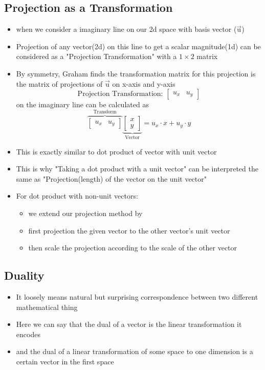 \documentclass[a4paper]{article}
\begin{document}
\subsection{Projection as a Transformation}
\begin{itemize}
	\item when we consider a imaginary line on our 2d space with
	      basis vector ($\vec{\text{u}}$)
	\item Projection of any vector(2d) on this line to get
	      a scalar magnitude(1d) can be considered as a
	      "Projection Transformation" with a
	      $1 \times 2$ matrix
	\item By symmetry, Graham finds the transformation
	      matrix for this projection is the matrix of projections
	      of $\vec{\text{u}}$ on x-axis and y-axis
	      \[
		      \text{Projection Transformation: }
		      \begin{bmatrix}
			      u_{x} & u_{y}  \end{bmatrix}
	      \]
	      on the imaginary line can be calculated as
	      \[
		      \overbrace{
			      \begin{bmatrix}
				      u_{x} & u_{y}  \end{bmatrix}
		      }^{\text{Transform}}
		      \underbrace{
			      \begin{bmatrix}
				      x \\
				      y\end{bmatrix}
		      }_{\text{Vector}}
		      = u_{x} \cdot x
		      + u_{y} \cdot y
	      \]
	\item This is exactly similar to dot product of vector
	      with unit vector
	\item This is why "Taking a dot product with a unit vector"
	      can be interpreted the same as
	      "Projection(length) of the vector on the unit vector"
	\item For dot product with non-unit vectors:
	      \begin{itemize}
		      \item we extend our projection method by
		      \item first projection the given vector to the
		            other vector's unit vector
		      \item then scale the projection according to the
		            scale of the other vector
	      \end{itemize}
\end{itemize}

\subsection{Duality}
\begin{itemize}
	\item It loosely means natural but surprising correspondence
	      between two different mathematical thing
	\item Here we can say that the dual of a vector is the
	      linear transformation it encodes
	\item and the dual of a linear transformation of some space to
	      one dimension is a certain vector in the first space
\end{itemize}
\end{document}
